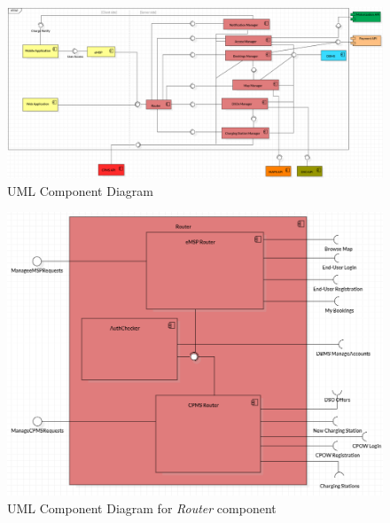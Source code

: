 \documentclass[a4paper]{report}
\begin{document}
\begin{figure}[hp]
\centering
\includegraphics[scale=0.4 ]{img/GENERAL DIAGRAM_v3.png}
\caption{UML Component Diagram}
\label{fig:general-component-diagram}
\end{figure}


\begin{figure}[hp]
\centering
\includegraphics[scale=0.6]{img/ROUTER.png}
\caption{UML Component Diagram for \textit{Router} component}
\label{fig:router-component}
\end{figure}
\end{document}
